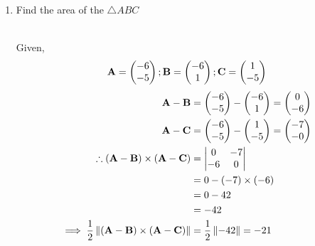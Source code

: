 \documentclass[11pt]{book}
\begin{document}
\begin{enumerate}[label=\thesection.\arabic*.,ref=\thesection.\theenumi]
\item Find the area of the $\triangle ABC$

	\solution\\
Given,
\begin{align}
 \mathbf{A} = \begin{pmatrix}-6\\-5\end{pmatrix};
 \mathbf{B} = \begin{pmatrix}-6\\1\end{pmatrix};
 \mathbf{C} = \begin{pmatrix}1\\-5\end{pmatrix}
 \end{align}
 \begin{align}
 \mathbf{A}-\mathbf{B} &= \begin{pmatrix}-6\\-5\end{pmatrix} - \begin{pmatrix}-6\\1\end{pmatrix} = \begin{pmatrix}0\\-6\end{pmatrix}\\
 \mathbf{A}-\mathbf{C} &= \begin{pmatrix}-6\\-5\end{pmatrix} - \begin{pmatrix}1\\-5\end{pmatrix} = \begin{pmatrix}-7\\-0\end{pmatrix}\\
\therefore(\mathbf{A}-\mathbf{B})\times(\mathbf{A}-\mathbf{C}) 
 &= \begin{vmatrix}0 & -7\\ -6 & 0\end{vmatrix}\\
 &= 0 - (-7) \times (-6)\\ &= 0-42\\ &= -42\\
 \implies\frac{1}{2}\left\lVert(\mathbf{A}-\mathbf{B})\times(\mathbf{A}-\mathbf{C})\right\rVert &= \frac{1}{2}\left\lVert-42\right\rVert= -21
\end{align}


\end{enumerate}
\end{document}
